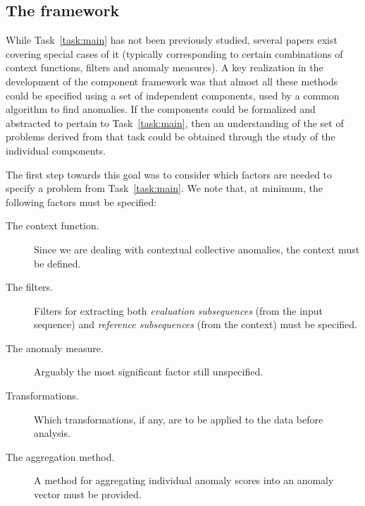 \subsection{The framework}
\label{sect:framework}

While Task~\ref{task:main} has not been previously studied, several papers exist covering special cases of it (typically corresponding to certain combinations of context functions, filters and anomaly measures). A key realization in the development of the component framework was that almost all these methods could be specified using a set of independent components, used by a common algorithm to find anomalies. If the components could be formalized and abstracted to pertain to Task~\ref{task:main}, then an understanding of the set of problems derived from that task could be obtained through the study of the individual components.

The first step towards this goal was to consider which factors are needed to specify a problem from Task~\ref{task:main}. We note that, at minimum, the following factors must be specified:

\begin{description}
  \item[The context function.] Since we are dealing with contextual collective anomalies, the context must be defined.
  \item[The filters.] Filters for extracting both \emph{evaluation subsequences} (from the input sequence) and \emph{reference subsequences} (from the context) must be specified.
  \item[The anomaly measure.] Arguably the most significant factor still unspecified.
  \item[Transformations.] Which transformations, if any, are to be applied to the data before analysis.
  \item[The aggregation method.] A method for aggregating individual anomaly scores into an anomaly vector must be provided.
\end{description}

